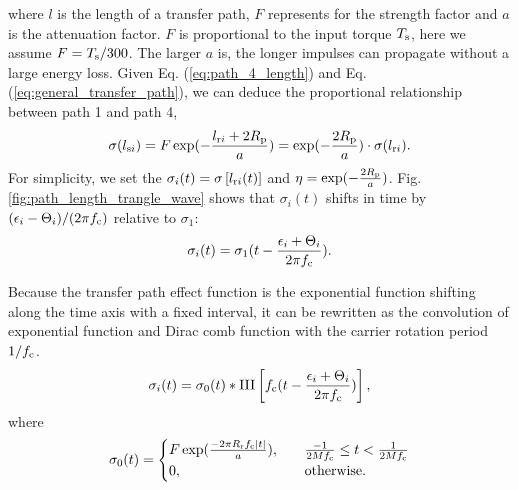 \documentclass[a4paper,fleqn]{cas-sc}%
\begin{document}
where $l$ is the length of a transfer path, $F$ represents for the strength factor and $a$ is the attenuation factor. $F$ is proportional to the input torque $T_{\rm s}$, here we assume $F=T_{\rm s}/300$. The larger $a$ is, the longer impulses can propagate without a large energy loss. Given Eq. (\ref{eq:path_4_length}) and Eq. (\ref{eq:general_transfer_path}), we can deduce the proportional relationship between path 1 and path 4,
\begin{equation}
    \sigma (l_{{\rm s}i})=F\exp(-\frac{l_{{\rm r}i}+2 R_{\rm p}}{a})=\exp(-\frac{2 R_{\rm p}}{a}) \cdot \sigma(l_{{\rm r}i}).
\end{equation}
For simplicity, we set the $\sigma_i(t)=\sigma\left[l_{{\rm r}i}(t)\right]$ and $\eta=\exp(-\frac{2 R_{\rm p}}{a})$. Fig. \ref{fig:path_length_trangle_wave} shows that $\sigma_{i}(t)$ shifts in time by $(\epsilon_i-\Theta_i)/(2 \pi f_{\rm c})$ relative to $\sigma_1$:
\begin{equation}
    \sigma_{i}(t)=\sigma_{1}(t-\frac{\epsilon_i+\Theta_i}{2 \pi f_{\rm c}}).
\end{equation}
\par Because the transfer path effect function is the exponential function shifting along the time axis with a fixed interval, it can be rewritten as the convolution of exponential function and Dirac comb function with the carrier rotation period $1/f_{\rm c}$.
\begin{equation}
    \sigma_i(t)=\sigma_0(t) \ast \operatorname{III}\left[f_{\rm c} (t - \frac{\epsilon_i+\Theta_i}{2 \pi f_{\rm c}})\right],\label{eq:transfer_path_convolution_form}
\end{equation}
where
\begin{equation}
    \sigma_0(t)=\begin{cases}F \exp(\frac{- 2 \pi R_{\rm r} f_{\rm c} \left|t\right|}{a}),\quad &\frac{-1}{2 M f_{\rm c}} \leq t < \frac{1}{2 M f_{\rm c}}\\
        0, &\text{otherwise}.
    \end{cases}\label{eq:tranfer_path_time_shape}
\end{equation}
\end{document}
